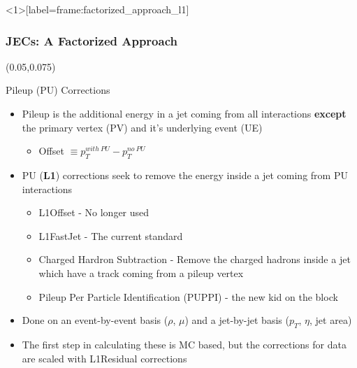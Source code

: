\begin{frame}<1>[label=frame:factorized_approach_l1]
	\frametitle{JECs: A Factorized Approach}
	\begin{textblock}{.9}(0.05,0.075) %
		\begin{figure}
			\label{fig:factorized_approach}
		\end{figure}
	\end{textblock}
	\vspace*{2.3cm}
	\begin{block}{Pileup (PU) Corrections}
		\begin{itemize}
			\footnotesize
			\item Pileup is the additional energy in a jet coming from all interactions \textbf{except} the primary vertex (PV) and it's underlying event (UE)
                          \begin{itemize}
                                \footnotesize
                                \item {\color{orange} Offset} $\equiv p_{T}^{with\ PU} - p_{T}^{no\ PU}$
                        \end{itemize}
			\item PU (\textbf{L1}) corrections seek to remove the energy inside a jet coming from PU interactions
			\begin{itemize}
				\footnotesize
				\item L1Offset - No longer used
				\item L1FastJet - The current standard
				\item Charged Hardron Subtraction - Remove the charged hadrons inside a jet which have a track coming from a pileup vertex
				\item Pileup Per Particle Identification (PUPPI) - the new kid on the block 
			\end{itemize}
			\item Done on an {\color{blue}event-by-event} basis ($\rho$, $\mu$) and a {\color{red}jet-by-jet} basis ($p_{T}$, $\eta$, jet area)
			\item The first step in calculating these is MC based, but the corrections for data are scaled with L1Residual corrections

\end{itemize}
\end{block}
\end{frame}
